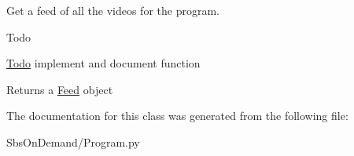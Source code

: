 \-Get a feed of all the videos for the program. 

\begin{DoxyRefDesc}{\-Todo}
\item[\hyperlink{todo__todo000005}{\-Todo}]implement and document function \end{DoxyRefDesc}
\begin{DoxyReturn}{\-Returns}
a \hyperlink{namespace_sbs_on_demand_1_1_feed}{\-Feed} object 
\end{DoxyReturn}


\-The documentation for this class was generated from the following file\-:\begin{DoxyCompactItemize}
\item 
\-Sbs\-On\-Demand/\-Program.\-py\end{DoxyCompactItemize}
